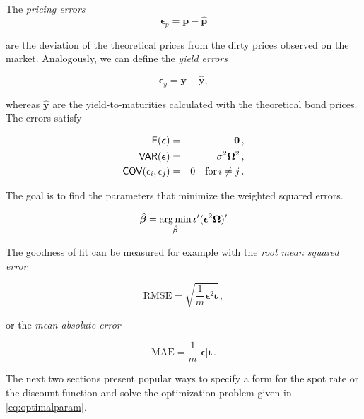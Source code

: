 The \emph{pricing errors}
\begin{equation*}
  \label{eq:pricingerrors}
  \bm{\epsilon}_p = \bm{p-\hat{p}}
\end{equation*}

are the deviation of the theoretical prices from the dirty prices observed on the market. Analogously, we can define the \emph{yield errors}


\begin{equation*}
  \label{eq:yielderrors}
  \bm{\epsilon}_y = \bm{y-\hat{y}},
\end{equation*}

whereas $\hat{\bm{y}}$ are the yield-to-maturities calculated with the theoretical bond prices. The errors satisfy

\begin{eqnarray*}
  \label{eq:residuals}
  \mathsf{E}(\bm{\epsilon}) &=& \bm{0}\,,\\
  \mathsf{VAR}(\bm{\epsilon}) &=&\sigma^2\bm{\Omega}^2\,,\\
  \mathsf{COV}(\epsilon_i, \epsilon_j) &=& 0 \quad \mbox{for}\,i\neq j\, .
\end{eqnarray*}

The goal is to find the parameters that minimize the weighted squared errors.


\begin{equation}
  \label{eq:optimalparam}
  \hat{\bm{\beta}}= \operatorname*{arg\,min}_{\hat{\bm{\beta}}}\bm{\iota}'(\bm{\epsilon}^2\bm{\Omega})'
\end{equation}

The goodness of fit can be measured for example with the \emph{root mean squared error}

\begin{equation*}
  \label{eq:rmse}
  \mbox{RMSE}=\sqrt{\frac{1}{m}\bm{\epsilon}^2\bm{\iota}}\,,
\end{equation*}

or the \emph{mean absolute error}

\begin{equation*}
  \label{eq:mae}
  \mbox{MAE}=\frac{1}{m}|\bm{\epsilon}|\bm{\iota}\,.
\end{equation*}

The next two sections present popular ways to specify a form for the spot rate or the discount function and solve the optimization problem given in \eqref{eq:optimalparam}.


